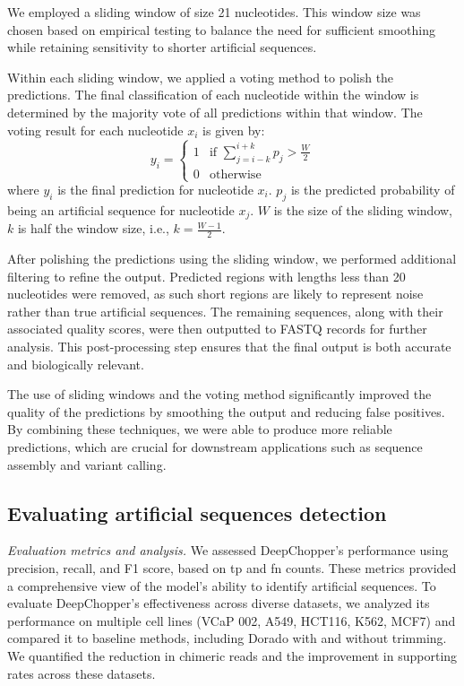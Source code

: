 \documentclass[pdflatex, sn-mathphys-num, lineno]{sn-jnl}%
\theoremstyle{thmstyleone}%
\theoremstyle{thmstyletwo}%
\theoremstyle{thmstylethree}%
\begin{document}
We employed a sliding window of size 21 nucleotides.
This window size was chosen based on empirical testing to balance the need for sufficient smoothing while retaining sensitivity to shorter artificial sequences.

Within each sliding window, we applied a voting method to polish the predictions.
The final classification of each nucleotide within the window is determined by the majority vote of all predictions within that window.
The voting result for each nucleotide \( x_i \) is given by:
\[
y_i = \begin{cases}
    1 & \text{if } \sum_{j=i-k}^{i+k} p_j > \frac{W}{2} \\
    0 & \text{otherwise}
\end{cases}
\]
where \( y_i \) is the final prediction for nucleotide \( x_i \). \( p_j \) is the predicted probability of being an artificial sequence for nucleotide \( x_j \). \( W \) is the size of the sliding window, \( k \) is half the window size, i.e., \( k = \frac{W-1}{2} \).


After polishing the predictions using the sliding window, we performed additional filtering to refine the output.
Predicted regions with lengths less than 20 nucleotides were removed, as such short regions are likely to represent noise rather than true artificial sequences.
The remaining sequences, along with their associated quality scores, were then outputted to FASTQ records for further analysis.
This post-processing step ensures that the final output is both accurate and biologically relevant.

The use of sliding windows and the voting method significantly improved the quality of the predictions by smoothing the output and reducing false positives.
By combining these techniques, we were able to produce more reliable predictions, which are crucial for downstream applications such as sequence assembly and variant calling.


\subsection{Evaluating artificial sequences detection}

\textit{Evaluation metrics and analysis.} We assessed DeepChopper's performance using precision, recall, and F1 score, based on \gls{tp} and \gls{fn} counts.
These metrics provided a comprehensive view of the model's ability to identify artificial sequences.
To evaluate DeepChopper's effectiveness across diverse datasets, we analyzed its performance on multiple cell lines (VCaP 002, A549, HCT116, K562, MCF7) and compared it to baseline methods, including Dorado with and without trimming.
We quantified the reduction in chimeric reads and the improvement in supporting rates across these datasets.
\end{document}
